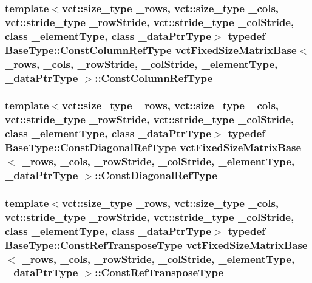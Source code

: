 \subsubsection[{Const\+Column\+Ref\+Type}]{\setlength{\rightskip}{0pt plus 5cm}template$<$vct\+::size\+\_\+type \+\_\+rows, vct\+::size\+\_\+type \+\_\+cols, vct\+::stride\+\_\+type \+\_\+row\+Stride, vct\+::stride\+\_\+type \+\_\+col\+Stride, class \+\_\+element\+Type, class \+\_\+data\+Ptr\+Type$>$ typedef {\bf Base\+Type\+::\+Const\+Column\+Ref\+Type} {\bf vct\+Fixed\+Size\+Matrix\+Base}$<$ \+\_\+rows, \+\_\+cols, \+\_\+row\+Stride, \+\_\+col\+Stride, \+\_\+element\+Type, \+\_\+data\+Ptr\+Type $>$\+::{\bf Const\+Column\+Ref\+Type}}\label{classvct_fixed_size_matrix_base_a5ef3c78aaccbfe9c5e4843bffa2770b5}
\hypertarget{classvct_fixed_size_matrix_base_a34c960d927329c09d97b6b69196c2cbe}{}
\subsubsection[{Const\+Diagonal\+Ref\+Type}]{\setlength{\rightskip}{0pt plus 5cm}template$<$vct\+::size\+\_\+type \+\_\+rows, vct\+::size\+\_\+type \+\_\+cols, vct\+::stride\+\_\+type \+\_\+row\+Stride, vct\+::stride\+\_\+type \+\_\+col\+Stride, class \+\_\+element\+Type, class \+\_\+data\+Ptr\+Type$>$ typedef {\bf Base\+Type\+::\+Const\+Diagonal\+Ref\+Type} {\bf vct\+Fixed\+Size\+Matrix\+Base}$<$ \+\_\+rows, \+\_\+cols, \+\_\+row\+Stride, \+\_\+col\+Stride, \+\_\+element\+Type, \+\_\+data\+Ptr\+Type $>$\+::{\bf Const\+Diagonal\+Ref\+Type}}\label{classvct_fixed_size_matrix_base_a34c960d927329c09d97b6b69196c2cbe}
\hypertarget{classvct_fixed_size_matrix_base_abea4d6acc16784903d485542c24d8446}{}
\subsubsection[{Const\+Ref\+Transpose\+Type}]{\setlength{\rightskip}{0pt plus 5cm}template$<$vct\+::size\+\_\+type \+\_\+rows, vct\+::size\+\_\+type \+\_\+cols, vct\+::stride\+\_\+type \+\_\+row\+Stride, vct\+::stride\+\_\+type \+\_\+col\+Stride, class \+\_\+element\+Type, class \+\_\+data\+Ptr\+Type$>$ typedef {\bf Base\+Type\+::\+Const\+Ref\+Transpose\+Type} {\bf vct\+Fixed\+Size\+Matrix\+Base}$<$ \+\_\+rows, \+\_\+cols, \+\_\+row\+Stride, \+\_\+col\+Stride, \+\_\+element\+Type, \+\_\+data\+Ptr\+Type $>$\+::{\bf Const\+Ref\+Transpose\+Type}}\label{classvct_fixed_size_matrix_base_abea4d6acc16784903d485542c24d8446}
\hypertarget{classvct_fixed_size_matrix_base_a506ec116d1e4c9c1b5d89f9f952e5b2d}{}
